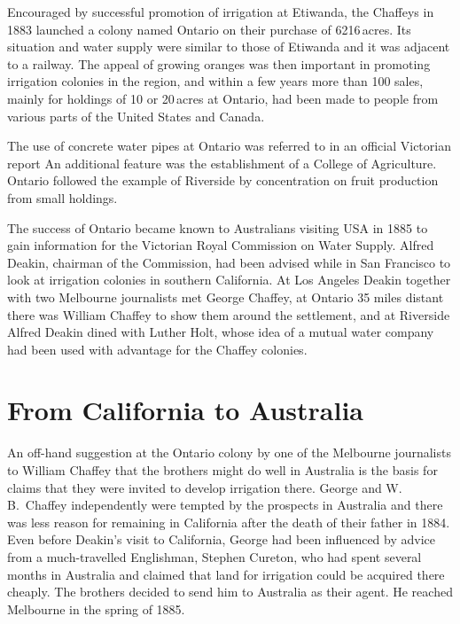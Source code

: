 Encouraged by successful promotion of irrigation at Etiwanda, the
Chaffeys in 1883 laun\-ch\-ed a colony named Ontario
 on their purchase of
6216\,acres.  Its situation and water supply were similar to those of
Etiwanda and it was adjacent to a railway.  The appeal of growing
oranges was then important in promoting irrigation colonies in the
region, and within a few years more than 100 sales, mainly for
holdings of 10 or 20\,acres at Ontario, had been made to people from
various parts of the United States and
Canada.

The use of concrete water pipes at Ontario was referred to in an
official Victorian report An additional feature was the establishment
of a College of Agriculture.  Ontario followed the example of
Riverside by concentration on fruit production from small
holdings.

The success of Ontario became known to Australians visiting USA in
1885 to gain information for the Victorian Royal Commission on Water
Supply. Alfred Deakin, 
chairman of the Commission, had been advised while in San Francisco to
look at irrigation colonies in southern California.  At Los Angeles
Deakin together with two Melbourne journalists met George Chaffey, at
Ontario 35 miles distant there was William Chaffey to show them around
the settlement, and at Riverside Alfred Deakin dined with Luther Holt,
whose idea of a mutual water company had been used with advantage for
the Chaffey colonies.

\section*{From California to Australia}

An off-hand suggestion at the Ontario colony by one of the Melbourne
journalists to William Chaffey that the brothers might do well in
Australia is the basis for claims that they were invited to develop
irrigation there.  George and W.\,B.~Chaffey independently were
tempted by the prospects in Australia and there was less reason for
remaining in California after the death of their father in 1884.  Even
before Deakin's visit to California, George had been influenced by
advice from a much-travelled Englishman, Stephen Cureton,
 who had
spent several months in Australia and claimed that land for irrigation
could be acquired there cheaply.  The brothers decided to send him to
Australia as their agent.  He reached Melbourne in the spring of
1885.

